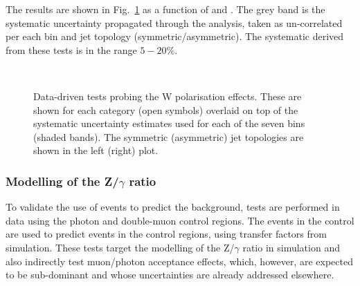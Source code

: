 The results are shown in Fig.~\ref{fig:closureMuPToMuM} as a function of \scalht and \njet. 
The grey band is the systematic uncertainty propagated through the analysis, 
taken as un-correlated per each \scalht bin and jet topology (symmetric/asymmetric). The systematic derived from these tests is
in the range $5-20\%$.



\begin{figure}[h!]
  \begin{center}
    ~~
    \caption{Data-driven tests probing the W polarisation effects. 
      These are shown for each
      \njet category (open symbols) overlaid on top of the systematic
      uncertainty estimates used for each of the seven \scalht bins
      (shaded bands). 
      The symmetric (asymmetric) jet topologies are shown in the left (right) plot.       
    }
    \label{fig:closureMuPToMuM}
  \end{center} 
\end{figure}



\subsubsection*{Modelling of the Z/$\gamma$ ratio}
\label{sec:tfSyst_ZGratio}
To validate the use of \gj events to predict the \znunu
background, tests are performed in data using the photon and double-muon control regions. 
The events in the \gj control are used to predict events in the \mmj control regions, 
using transfer factors from simulation. 
These tests target the modelling of the Z/$\gamma$ ratio in simulation and 
also indirectly test muon/photon acceptance effects, which, however, 
are expected to be sub-dominant and whose uncertainties are already addressed elsewhere. 

